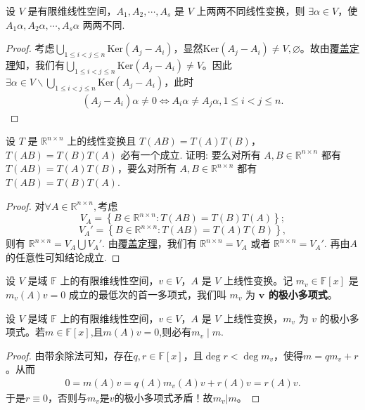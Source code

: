 \documentclass[../../main.tex]{subfiles}
\begin{document}
\begin{example}
设 \( V \) 是有限维线性空间，\( A_1, A_2, \cdots, A_s \) 是 \( V \) 上两两不同线性变换，则 \( \exists \alpha \in V \)，使 \( A_1\alpha, A_2\alpha, \cdots, A_s\alpha \) 两两不同.
\end{example}
\begin{proof}
考虑$\bigcup_{1\leqslant i<j\leqslant n}{\mathrm{Ker}\left( A_j-A_i \right)}$，显然$\mathrm{Ker}\left( A_j-A_i \right) \ne V,\varnothing$。故由\hyperref[theorem:覆盖定理]{覆盖定理}知，我们有$\bigcup_{1\leqslant i<j\leqslant n}{\mathrm{Ker}\left( A_j-A_i \right)}\ne V$。因此$\exists \alpha \in V\backslash \bigcup_{1\leqslant i<j\leqslant n}{\mathrm{Ker}\left( A_j-A_i \right)}$，此时
\begin{align*}
\left( A_j-A_i \right) \alpha \ne 0\Longleftrightarrow A_i\alpha \ne A_j\alpha ,1\leqslant i<j\leqslant n.
\end{align*}

\end{proof}

\begin{example}
设 \( T \) 是 \( \mathbb{R}^{n \times n} \) 上的线性变换且 \( T(AB) = T(A)T(B) \)，\( T(AB) = T(B)T(A) \) 必有一个成立. 证明: 要么对所有 \( A, B \in \mathbb{R}^{n \times n} \) 都有 \( T(AB) = T(A)T(B) \)，要么对所有 \( A, B \in \mathbb{R}^{n \times n} \) 都有 \( T(AB) = T(B)T(A) \).  
\end{example}
\begin{proof}
对$\forall A\in \mathbb{R}^{n\times n},$考虑  
\[
V_A = \left\{ B \in \mathbb{R}^{n \times n} : T(AB) = T(B)T(A) \right\};
\]  
\[
V_A' = \left\{ B \in \mathbb{R}^{n \times n} : T(AB) = T(A)T(B) \right\},
\]  
则有 \( \mathbb{R}^{n \times n} = V_A \bigcup V_A' \). 由\hyperref[theorem:覆盖定理]{覆盖定理}，我们有 \( \mathbb{R}^{n \times n} = V_A \) 或者 \( \mathbb{R}^{n \times n} = V_A' \).  
再由$A$的任意性可知结论成立.

\end{proof}

\begin{definition}
设 \( V \) 是域 \( \mathbb{F} \) 上的有限维线性空间，\( v \in V \)，\( A \) 是 \( V \) 上线性变换。记 \( m_v \in \mathbb{F}[x] \) 是 \( m_v(A)v = 0 \) 成立的最低次的首一多项式，我们叫 \( m_v \) 为\textbf{ \( \boldsymbol{v} \) 的极小多项式}。
\end{definition}

\begin{proposition}\label{proposition:向量的极小多项式的整性}
设 \( V \) 是域 \( \mathbb{F} \) 上的有限维线性空间，\( v \in V \)，\( A \) 是 \( V \) 上线性变换，\( m_v \) 为 \( v \) 的极小多项式。若$m\in \mathbb{F}[x]$,且$m(A)v=0$,则必有$m_v\mid m.$
\end{proposition}
\begin{proof}
由带余除法可知，存在\( q,r\in \mathbb{F}[x] \)，且\( \deg r<\deg m_v \)，使得\( m=qm_v+r \)。从而
\begin{align*}
0=m(A)v=q(A)m_v(A)v+r(A)v=r(A)v.
\end{align*}
于是\( r\equiv 0 \)，否则与\( m_v \)是\( v \)的极小多项式矛盾！故\( m_v|m \)。

\end{proof}
\end{document}
